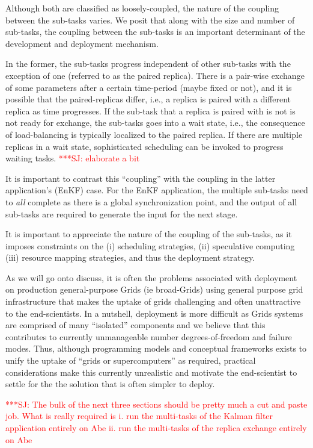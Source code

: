 \documentclass[conference,final]{IEEEtran}
\newcommand{\jhanote}[1]{ {\textcolor{red} { ***SJ: #1 }}}
\newcommand{\jhanote}[1]{}
\begin{document}
Although both are classified as loosely-coupled, the nature of the
coupling between the sub-tasks varies. We posit that along with the
size and number of sub-tasks, the coupling between the sub-tasks is an
important determinant of the development and deployment mechanism.

In the former, the sub-tasks
progress independent of other sub-tasks with the exception of one
(referred to as the paired replica). There is a pair-wise exchange of
some parameters after a certain time-period (maybe fixed or not), and
it is possible that the paired-replicas differ, i.e., a replica is
paired with a different replica as time progresses. If the sub-task
that a replica is paired with is not is not ready for exchange, the
sub-tasks goes into a wait state, i.e., the consequence of
load-balancing is typically localized to the paired replica. If there
are multiple replicas in a wait state, sophisticated scheduling can be
invoked to progress waiting tasks. \jhanote{elaborate a bit}

It is important to contrast this ``coupling'' with the coupling in the
latter application's (EnKF) case. For the EnKF
application, the multiple sub-tasks need to {\it all} complete
as there is a global synchronization point, and the output
of all sub-tasks are required to generate the input for the next
stage.

It is important to appreciate the nature of the coupling of the
sub-tasks, as it imposes constraints on the (i) scheduling strategies,
(ii) speculative computing (iii) resource mapping strategies, and thus
the deployment strategy.

As we will go onto discuss, it is often the problems associated with
deployment on production general-purpose Grids (ie broad-Grids) using
general purpose grid infrastructure that makes the uptake of grids
challenging and often unattractive to the end-scientists. In a
nutshell, deployment is more difficult as Grids systems are comprised
of many ``isolated'' components and we believe that this contributes
to currently unmanageable number degrees-of-freedom and failure modes.
Thus, although programming models and conceptual frameworks exists to
unify the uptake of ``grids or supercomputers'' as required, practical
considerations make this currently unrealistic and motivate the
end-scientist to settle for the the solution that is often simpler to
deploy.

\jhanote{The bulk of the next three sections should be pretty much a
  cut and paste job. What is really required is i. run the multi-tasks
  of the Kalman filter application entirely on Abe ii. run the
  multi-tasks of the replica exchange entirely on Abe}
\end{document}
